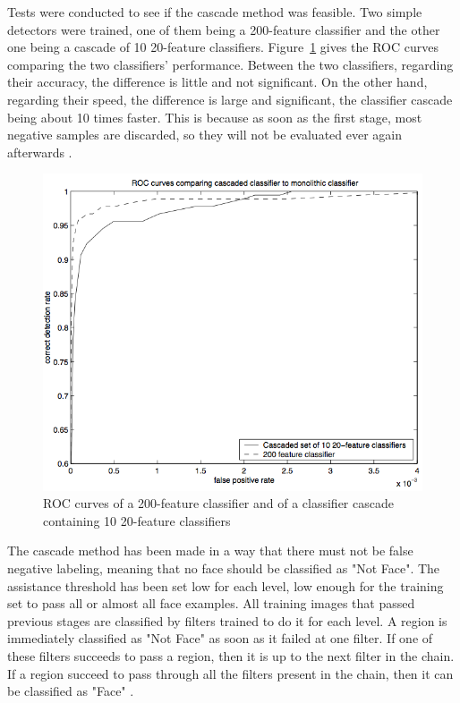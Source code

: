 \noindent Tests were conducted to see if the cascade method was feasible. Two simple detectors were trained, one of them being a 200-feature classifier and the other one being a cascade of 10 20-feature classifiers. Figure~\ref{haar_feature_cascade_example_result} gives the ROC curves comparing the two classifiers' performance. Between the two classifiers, regarding their accuracy, the difference is little and not significant. On the other hand, regarding their speed, the difference is large and significant, the classifier cascade being about 10 times faster. This is because as soon as the first stage, most negative samples are discarded, so they will not be evaluated ever again afterwards \cite{VIO01}.
\newline

\begin{figure}[!h]
\begin{center}
\noindent \includegraphics[scale=0.6]{figures/haar_feature_cascade_example_result} 
\newline
\caption{ROC curves of a 200-feature classifier and of a classifier cascade containing 10 20-feature classifiers}
\label{haar_feature_cascade_example_result}
\end{center} 
\end{figure}

\noindent The cascade method has been made in a way that there must not be false negative labeling, meaning that no face should be classified as "Not Face". The assistance threshold has been set low for each level, low enough for the training set to pass all or almost all face examples. All training images that passed previous stages are classified by filters trained to do it for each level. A region is immediately classified as "Not Face" as soon as it failed at one filter. If one of these filters succeeds to pass a region, then it is up to the next filter in the chain. If a region succeed to pass through all the filters present in the chain, then it can be classified as "Face" \cite{HEW07}.
\newline

